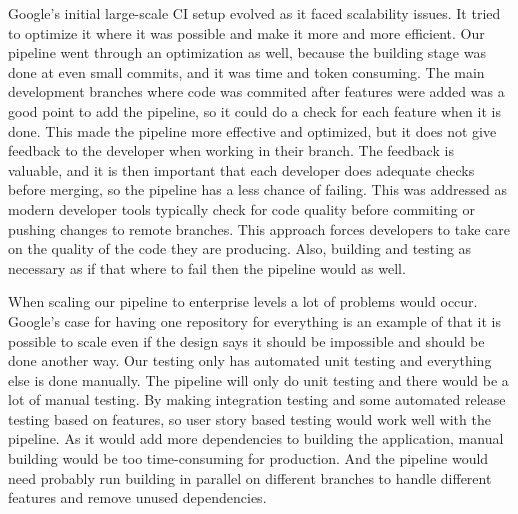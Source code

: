 Google's initial large-scale CI setup evolved as it faced scalability issues.
It tried to optimize it where it was possible and make it more and more efficient. \cite{GoogleTesting}
Our pipeline went through an optimization as well, because the building stage was done at even small commits, and it was time and token consuming.
The main development branches where code was commited after features were added was a good point to add the pipeline, so it could do a check for each feature when it is done.
This made the pipeline more effective and optimized, but it does not give feedback to the developer when working in their branch.
The feedback is valuable, and it is then important that each developer does adequate checks before merging, so the pipeline has a less chance of failing.
This was addressed as modern developer tools typically check for code quality before commiting or pushing changes to remote branches. 
This approach forces developers to take care on the quality of the code they are producing.
Also, building and testing as necessary as if that where to fail then the pipeline would as well.

When scaling our pipeline to enterprise levels a lot of problems would occur.
Google's case for having one repository for everything is an example of that it is possible to scale even if the design says it should be impossible and should be done another way. \cite{GoogleRepo}
Our testing only has automated unit testing and everything else is done manually. 
The pipeline will only do unit testing and there would be a lot of manual testing. 
By making integration testing and some automated release testing based on features, so user story based testing would work well with the pipeline.
As it would add more dependencies to building the application, manual building would be too time-consuming for production.
And the pipeline would need probably run building in parallel on different branches to handle different features and remove unused dependencies.

